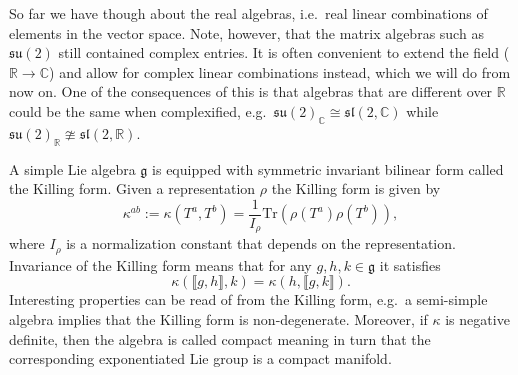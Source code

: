 So far we have though about the real algebras, i.e.\ real linear combinations of elements in the vector space. Note, however, that the matrix algebras such as $\mathfrak{su}(2)$ still contained complex entries. It is often convenient to extend the field ($\mathbb{R}\to\mathbb{C}$) and allow for complex linear combinations instead, which we will do from now on. One of the consequences of this is that algebras that are different over $\mathbb{R}$ could be the same when complexified, e.g.\ $\mathfrak{su}(2)_\mathbb{C}\cong \mathfrak{sl}(2,\mathbb{C})$ while $\mathfrak{su}(2)_\mathbb{R}\ncong\mathfrak{sl}(2,\mathbb{\mathbb{R}})$. 

A simple Lie algebra $\mathfrak{g}$ is equipped with symmetric invariant bilinear form called the Killing form. Given a representation $\rho$ the Killing form is given by 
\begin{equation}
    \kappa^{ab} := \kappa(T^a,T^b) =  \frac{1}{I_\rho}\text{Tr}\left(\rho(T^a)\rho(T^b)\right),
\end{equation}
where $I_\rho$ is a normalization constant that depends on the representation. Invariance of the Killing form means that for any $g,h,k\in\mathfrak{g}$ it satisfies 
\begin{equation}
    \kappa(\llbracket g,h\rrbracket,k) = \kappa(h,\llbracket g,k\rrbracket). 
\end{equation}
Interesting properties can be read of from the Killing form, e.g.\ a semi-simple algebra implies that the Killing form is non-degenerate. Moreover, if $\kappa$ is negative definite, then the algebra is called compact meaning in turn that the corresponding exponentiated Lie group is a compact manifold. 


